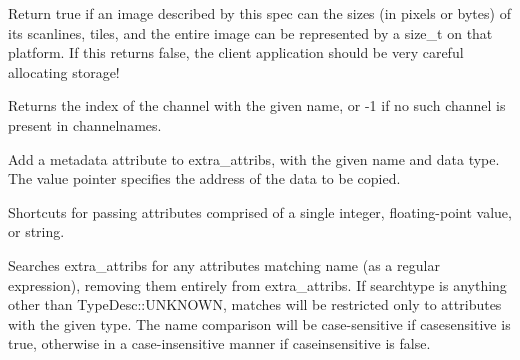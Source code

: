 Return {\cf true} if an image described by this spec can the sizes
(in pixels or bytes) of its scanlines, tiles, and the entire image can
be represented by a {\cf size_t} on that platform.  If this returns
{\cf false}, the client application should be very careful allocating
storage!
\apiend

\NEW %
Returns the index of the channel with the given name, or -1 if no such
channel is present in {\cf channelnames}.
\apiend



Add a metadata attribute to {\cf extra_attribs}, with the given name and
data type.  The {\cf value} pointer specifies
the address of the data to be copied.
\apiend

Shortcuts for passing attributes comprised of a single integer,
floating-point value, or string.
\apiend


Searches {\cf extra_attribs} for any attributes matching {\cf name} (as
a regular expression), removing them entirely from {\cf extra_attribs}.
If {\cf searchtype} is anything other than {\cf TypeDesc::UNKNOWN},
matches will be restricted only to attributes with the given type.
The name comparison will be case-sensitive if {\cf casesensitive} is true, otherwise
in a case-insensitive manner if {\cf caseinsensitive} is false.
\apiend


